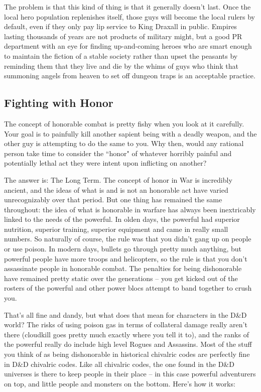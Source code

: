 The problem is that this kind of thing is that it generally doesn't last. Once the local hero population replenishes itself, those guys will become the local rulers by default, even if they only pay lip service to King Draxall in public. Empires lasting thousands of years are not products of military might, but a good PR department with an eye for finding up-and-coming heroes who are smart enough to maintain the fiction of a stable society rather than upset the peasants by reminding them that they live and die by the whims of guys who think that summoning angels from heaven to set off dungeon traps is an acceptable practice.

\subsection{Fighting with Honor}
\vspace*{-8pt}

The concept of honorable combat is pretty fishy when you look at it carefully. Your goal is to painfully kill another sapient being with a deadly weapon, and the other guy is attempting to do the same to you. Why then, would any rational person take time to consider the ``honor" of whatever horribly painful and potentially lethal act they were intent upon inflicting on another?

The answer is: The Long Term. The concept of honor in War is incredibly ancient, and the ideas of what is and is not an honorable act have varied unrecognizably over that period. But one thing has remained the same throughout: the idea of what is honorable in warfare has always been inextricably linked to the needs of the powerful. In olden days, the powerful had superior nutrition, superior training, superior equipment and came in really small numbers. So naturally of course, the rule was that you didn't gang up on people or use poison. In modern days, bullets go through pretty much anything, but powerful people have more troops and helicopters, so the rule is that you don't assassinate people in honorable combat. The penalties for being dishonorable have remained pretty static over the generations -- you get kicked out of the rosters of the powerful and other power blocs attempt to band together to crush you.

That's all fine and dandy, but what does that mean for characters in the D\&D world? The risks of using poison gas in terms of collateral damage really aren't there (cloudkill goes pretty much exactly where you tell it to), and the ranks of the powerful really do include high level Rogues and Assassins. Most of the stuff you think of as being dishonorable in historical chivalric codes are perfectly fine in D\&D chivalric codes. Like all chivalric codes, the one found in the D\&D universes is there to keep people in their place -- in this case powerful adventurers on top, and little people and monsters on the bottom. Here's how it works:

